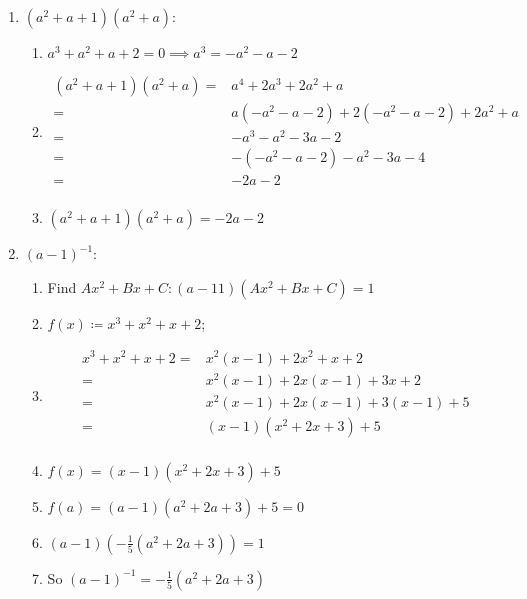 \documentclass[11pt]{article}
\begin{document}
\begin{enumerate}
    \item $(a^2+a+1)(a^2+a)$:
    \begin{enumerate}\
        \item $a^3+a^2+a+2=0\implies a^3=-a^2-a-2$
        \item \begin{align*}
            (a^2+a+1)(a^2+a)=&a^4+2a^3+2a^2+a\\
            =&a(-a^2-a-2)+2(-a^2-a-2)+2a^2+a\\
            =&-a^3-a^2-3a-2\\
            =&-(-a^2-a-2)-a^2-3a-4\\
            =&-2a-2\\
        \end{align*}
        \item $(a^2+a+1)(a^2+a)=-2a-2$\\
    \end{enumerate}
    \item $(a-1)^{-1}$:
    \begin{enumerate}
        \item Find $Ax^2+Bx+C:(a-11)(Ax^2+Bx+C)=1$
        \item $f(x)\coloneqq x^3+x^2+x+2$;
        \item \begin{align*}
            x^3+x^2+x+2=&x^2(x-1)+2x^2+x+2\\
            =&x^2(x-1)+2x(x-1)+3x+2\\
            =&x^2(x-1)+2x(x-1)+3(x-1)+5\\
            =&(x-1)(x^2+2x+3)+5\\
        \end{align*}
        \item $f(x)=(x-1)(x^2+2x+3)+5$
        \item $f(a)=(a-1)(a^2+2a+3)+5=0$
        \item $(a-1)(-\frac{1}{5}(a^2+2a+3))=1$
        \item So $(a-1)^{-1}=-\frac{1}{5}(a^2+2a+3)$
    \end{enumerate}
\end{enumerate}
\end{document}
